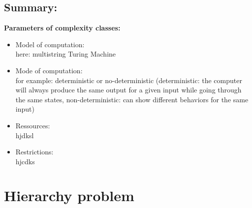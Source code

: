 \documentclass[a4]{scrartcl}
\begin{document}
\subsection*{Summary:}

\textbf{Parameters of complexity classes:}

\begin{itemize}
\item Model of computation: \\
here: multistring Turing Machine
\item Mode of computation: \\
for example: deterministic or no-deterministic (deterministic: the computer will always produce the same output for a given input while going through the same states, non-deterministic: can show different behaviors for the same input)
\item Ressources: \\ hjdksl
\item Restrictions: \\ hjcdks
\end{itemize}

















\section*{Hierarchy problem}



\newpage

\printbibliography
\end{document}
